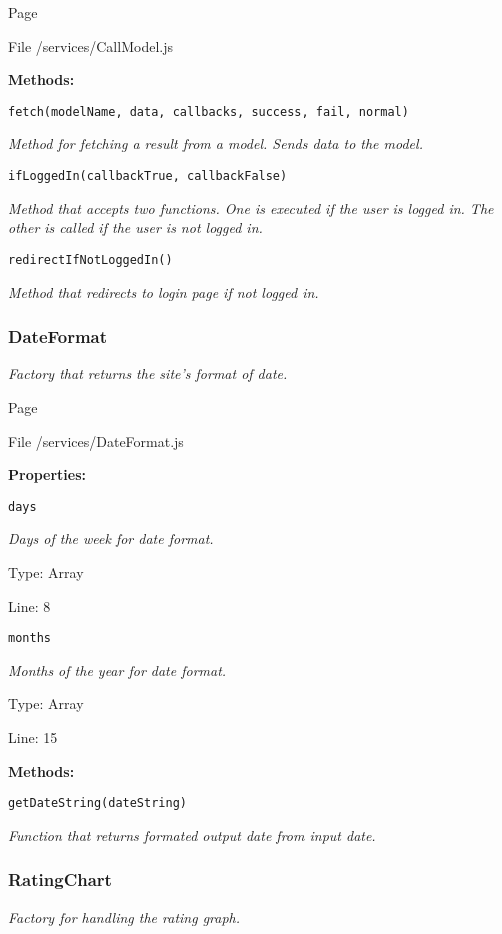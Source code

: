 Page \pageref{CallModel.js}

File /services/CallModel.js

\textbf{Methods:}

\texttt{fetch(modelName, data, callbacks, success, fail, normal)}

{\scriptsize
\textit{Method for fetching a result from a model.
Sends data to the model.}

}

\texttt{ifLoggedIn(callbackTrue, callbackFalse)}

{\scriptsize
\textit{Method that accepts two functions.
One is executed if the user is logged in.
The other is called if the user is not logged in.}

}

\texttt{redirectIfNotLoggedIn()}

{\scriptsize
\textit{Method that redirects to login page if not logged in.}

}

\subsubsection{DateFormat}
\textit{Factory that returns the site's format of date.}

Page \pageref{DateFormat.js}

File /services/DateFormat.js

\textbf{Properties:}

\texttt{days}

{\scriptsize
\textit{Days of the week for date format.}

Type: Array

Line: 8

}
\texttt{months}

{\scriptsize
\textit{Months of the year for date format.}

Type: Array

Line: 15

}
\textbf{Methods:}

\texttt{getDateString(dateString)}

{\scriptsize
\textit{Function that returns formated output date from input date.}

}

\subsubsection{RatingChart}
\textit{Factory for handling the rating graph.}

